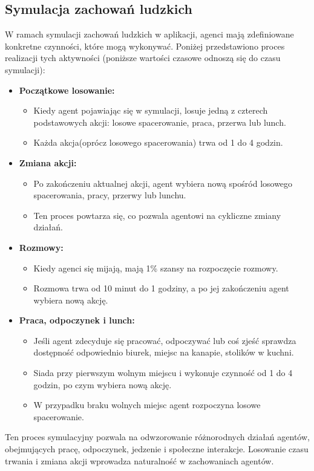 \subsection{\textbf{Symulacja zachowań ludzkich}}
W ramach symulacji zachowań ludzkich w aplikacji, agenci mają zdefiniowane konkretne czynności, które mogą wykonywać. Poniżej przedstawiono proces realizacji tych aktywności (poniższe wartości czasowe odnoszą się do czasu symulacji):

\begin{itemize}
	\item \textbf{Początkowe losowanie:}
	\begin{itemize}
		\item Kiedy agent pojawiając się w symulacji, losuje jedną z czterech podstawowych akcji: losowe spacerowanie, praca, przerwa lub lunch.
		\item Każda akcja(oprócz losowego spacerowania) trwa od 1 do 4 godzin.
	\end{itemize}
	
	\item \textbf{Zmiana akcji:}
	\begin{itemize}
		\item Po zakończeniu aktualnej akcji, agent wybiera nową spośród losowego spacerowania, pracy, przerwy lub lunchu.
		\item Ten proces powtarza się, co pozwala agentowi na cykliczne zmiany działań.
	\end{itemize}
	
	\item \textbf{Rozmowy:}
	\begin{itemize}
		\item Kiedy agenci się mijają, mają 1\% szansy na rozpoczęcie rozmowy.
		\item Rozmowa trwa od 10 minut do 1 godziny, a po jej zakończeniu agent wybiera nową akcję.
	\end{itemize}
	
	\item \textbf{Praca, odpoczynek i lunch:}
	\begin{itemize}
		\item Jeśli agent zdecyduje się pracować, odpoczywać lub coś zjeść sprawdza dostępność odpowiednio biurek, miejsc na kanapie, stolików w kuchni.
		\item Siada przy pierwszym wolnym miejscu i wykonuje czynność od 1 do 4 godzin, po czym wybiera nową akcję.
		\item W przypadku braku wolnych miejsc agent rozpoczyna losowe spacerowanie.
	\end{itemize}
\end{itemize}

Ten proces symulacyjny pozwala na odwzorowanie różnorodnych działań agentów, obejmujących pracę, odpoczynek, jedzenie i społeczne interakcje. Losowanie czasu trwania i zmiana akcji wprowadza naturalność w zachowaniach agentów.



